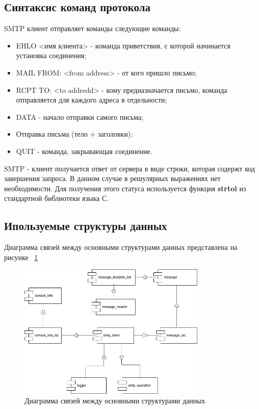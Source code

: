\documentclass[a4paper,12pt]{article}
\begin{document}
\subsection{Синтаксис команд протокола}
SMTP клиент отправляет команды следующие команды:
\begin{itemize}
\item EHLO <имя клиента> - команда приветствия, с которой начинается установка соединения;
\item MAIL FROM: <from address> - от кого пришло письмо;
\item RCPT TO: <to addredd> - кому предназначается письмо, команда отправляется для каждого адреса в отдельности;
\item DATA - начало отправки самого письма;
\item Отправка письма (тело + заголовки);
\item QUIT - команда, закрывающая соединение.
\end{itemize}

SMTP - клиент получается ответ от сервера в виде строки, которая содержт код завершения запроса. В данном случае в решулярных выражениях нет
необходимости. Для получения этого статуса используется функция \textbf{strtol} из стандартной библиотеки языка С. 

\subsection{Ипользуемые структуры данных}

Диаграмма связей между основными структурами данных представлена на рисунке ~\ref{fig:data_structures}

\begin{figure}[h]
\centering
\includegraphics[width=0.8\textwidth]{includes/component_smtp_client.png}
\caption{Диаграмма связей между основными структурами данных}
\label{fig:data_structures}
\end{figure}
\end{document}
